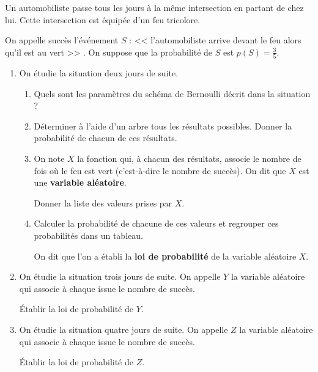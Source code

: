 \documentclass[12pt,openright,twoside,french]{book}
\begin{document}

Un automobiliste passe tous les jours à la même intersection en partant de chez lui. Cette intersection est équipée d’un feu tricolore.\par On appelle succès l’événement $S$ : << l’automobiliste arrive devant le feu alors qu’il est au vert >> . On suppose que la probabilité de $S$ est $p(S) = \frac 3 5$.\bigskip

\begin{enumerate}
    \item On étudie la situation deux jours de suite.
        \begin{enumerate}
            \item Quels sont les paramètres du schéma de Bernoulli décrit dans la situation ?
            \item Déterminer à l’aide d’un arbre tous les résultats possibles. Donner la probabilité de chacun de ces résultats.
            \item On note $X$ la fonction qui, à chacun des résultats, associe le nombre de fois où le feu est vert (c'est-à-dire le nombre de succès). On dit que $X$ est une \textbf{variable aléatoire}.\par
                Donner la liste des valeurs prises par $X$.\par
            \item Calculer la probabilité de chacune de ces valeurs et regrouper ces probabilités dans un tableau.\par
                On dit que l’on a établi la \textbf{loi de probabilité} de la variable aléatoire $X$.
        \end{enumerate}
    
    \item On étudie la situation trois jours de suite. On appelle $Y$ la variable aléatoire qui associe à chaque issue le nombre de succès.\par
    \'Etablir la loi de probabilité de $Y$.
    
    \item On étudie la situation quatre jours de suite. On appelle $Z$ la variable aléatoire qui associe à chaque issue le nombre de succès.\par
    \'Etablir la loi de probabilité de $Z$.

\end{enumerate}
\end{document}
